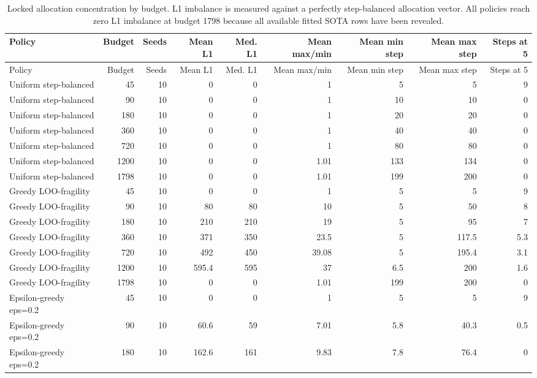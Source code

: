 \begin{landscape}
\begin{scriptsize}
\begin{longtable}{lrrrrrrrr}
\caption{Locked allocation concentration by budget. L1 imbalance is measured against a perfectly step-balanced allocation vector. All policies reach zero L1 imbalance at budget 1798 because all available fitted SOTA rows have been revealed.}\label{tab:concentration-by-budget}\\
\toprule
Policy & Budget & Seeds & Mean L1 & Med. L1 & Mean max/min & Mean min step & Mean max step & Steps at 5 \\
\midrule
\endfirsthead
\toprule
Policy & Budget & Seeds & Mean L1 & Med. L1 & Mean max/min & Mean min step & Mean max step & Steps at 5 \\
\midrule
\endhead
Uniform step-balanced & 45 & 10 & 0 & 0 & 1 & 5 & 5 & 9 \\
Uniform step-balanced & 90 & 10 & 0 & 0 & 1 & 10 & 10 & 0 \\
Uniform step-balanced & 180 & 10 & 0 & 0 & 1 & 20 & 20 & 0 \\
Uniform step-balanced & 360 & 10 & 0 & 0 & 1 & 40 & 40 & 0 \\
Uniform step-balanced & 720 & 10 & 0 & 0 & 1 & 80 & 80 & 0 \\
Uniform step-balanced & 1200 & 10 & 0 & 0 & 1.01 & 133 & 134 & 0 \\
Uniform step-balanced & 1798 & 10 & 0 & 0 & 1.01 & 199 & 200 & 0 \\
Greedy LOO-fragility & 45 & 10 & 0 & 0 & 1 & 5 & 5 & 9 \\
Greedy LOO-fragility & 90 & 10 & 80 & 80 & 10 & 5 & 50 & 8 \\
Greedy LOO-fragility & 180 & 10 & 210 & 210 & 19 & 5 & 95 & 7 \\
Greedy LOO-fragility & 360 & 10 & 371 & 350 & 23.5 & 5 & 117.5 & 5.3 \\
Greedy LOO-fragility & 720 & 10 & 492 & 450 & 39.08 & 5 & 195.4 & 3.1 \\
Greedy LOO-fragility & 1200 & 10 & 595.4 & 595 & 37 & 6.5 & 200 & 1.6 \\
Greedy LOO-fragility & 1798 & 10 & 0 & 0 & 1.01 & 199 & 200 & 0 \\
Epsilon-greedy eps=0.2 & 45 & 10 & 0 & 0 & 1 & 5 & 5 & 9 \\
Epsilon-greedy eps=0.2 & 90 & 10 & 60.6 & 59 & 7.01 & 5.8 & 40.3 & 0.5 \\
Epsilon-greedy eps=0.2 & 180 & 10 & 162.6 & 161 & 9.83 & 7.8 & 76.4 & 0 \\

\end{longtable}
\end{scriptsize}
\end{landscape}
